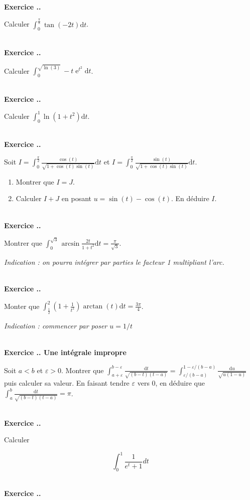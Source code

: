 \documentclass{article}
\newcommand{\di}{\mathrm{d}}
\newcommand{\ex}{{\operatorname{e}}}
\newcounter{exo}
\newcommand{\exercice}[1][\null]{\textbf{\\ Exercice \thesection.\theexo. #1} \addtocounter{exo}{1}}
\begin{document}
\exercice

Calculer $\displaystyle \int_{0}^{\frac{\pi}{8}} \tan(-2t) \di t$.

\exercice

Calculer $\displaystyle \int_{0}^{\sqrt{\ln(3)}} -t\ex^{t^2} \di t$.

\exercice

Calculer $\displaystyle \int_0^1 \ln(1+t^2) \di t$.


\exercice

Soit $\displaystyle I = \int_{0}^{\frac{\pi}{2}} \frac{\cos(t)}{\sqrt{1+ \cos(t) \sin(t)}} \di t$ et $\displaystyle I = \int_{0}^{\frac{\pi}{2}} \frac{\sin(t)}{\sqrt{1+ \cos(t) \sin(t)}} \di t$.

\begin{enumerate}

\item Montrer que $I = J$.

\item Calculer $I+J$ en posant $u = \sin(t) - \cos(t)$. En déduire $I$.

\end{enumerate}


\exercice
Montrer que $\displaystyle \int_{0}^{\sqrt{3}} \arcsin \frac{2t}{1+t^2} \di t = \frac{\pi}{\sqrt{3}}$.

\emph{Indication : on pourra intégrer par parties le facteur 1 multipliant l'arc.}


\exercice

Monter que $\displaystyle \int_{\frac{1}{2}}^2 \left(1+\frac{1}{t^2}\right) \arctan (t) \di t = \frac{3 \pi}{4}$.

\emph{Indication : commencer par poser $u = 1/t$}


\exercice[Une intégrale impropre]

Soit $a<b$ et $\varepsilon > 0$. Montrer que $\displaystyle \int_{a+ \varepsilon}^{b - \varepsilon} \frac{\di t}{\sqrt{(b-t)(t-a)}} = \int_{\varepsilon/(b-a)}^{1-\varepsilon/(b-a)} \frac{\di u}{\sqrt{u(1-u)}}$ puis calculer sa valeur. En faisant tendre $\varepsilon$ vers 0, en déduire que $\displaystyle \int_{a}^{b} \frac{\di t}{\sqrt{(b-t)(t-a)}}  = \pi$.

\exercice 

Calculer 

\begin{equation*}
    \int_0^1 \frac{1}{e^t + 1} dt 
\end{equation*}

\exercice 
\end{document}
